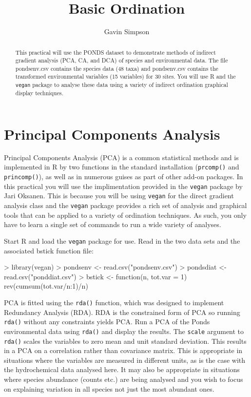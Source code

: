 \documentclass[a4paper,10pt]{article}
\title{Basic Ordination }
\author{Gavin Simpson}
\newcommand{\rda}{\texttt{rda()}\xspace}
\newcommand{\R}{\textsf{R}\xspace}
\newcommand{\vegan}{\texttt{vegan}\xspace}
\begin{document}
\maketitle

\begin{abstract}
This practical will use the PONDS dataset to demonstrate methods of indirect gradient analysis (PCA, CA, and DCA) of species and environmental data. The file pondsenv.csv contains the species data (48 taxa) and pondsenv.csv contains the transformed environmental variables (15 variables) for 30 sites. You will use \R and the \vegan package to analyse these data using a variety of indirect ordination graphical display techniques.
\end{abstract}


\section{Principal Components Analysis}
Principal Components Analysis (PCA) is a common statistical methods and is implemented in \R by two functions in the standard installation (\texttt{prcomp()} and \texttt{princomp()}), as well as in numerous guises as part of other add-on packages. In this practical you will use the implimentation provided in the \vegan package by Jari Oksanen. This is because you will be using \vegan for the direct gradient analysis class and the \vegan package provides a rich set of analysis and graphical tools that can be applied to a variety of ordination techniques. As such, you only have to learn a single set of commands to run a wide variety of analyses.

Start \R and load the \vegan package for use. Read in the two data sets and the associated bstick function file:

\begin{Schunk}
\begin{Sinput}
> library(vegan)
> pondsenv <- read.csv("pondsenv.csv")
> pondsdiat <- read.csv("ponddiat.csv")
> bstick <- function(n, tot.var = 1) rev(cumsum(tot.var/n:1)/n)
\end{Sinput}
\end{Schunk}

PCA is fitted using the \rda function, which was designed to implement Redundancy Analysis (RDA). RDA is the constrained form of PCA so running \rda without any constraints yields PCA. Run a PCA of the Ponds environmental data using \rda and display the results. The \texttt{scale} argument to \rda scales the variables to zero mean and unit standard deviation. This results in a PCA on a correlation rather than covariance matrix. This is appropriate in situations where the variables are measured in different units, as is the case with the hydrochemical data analysed here. It may also be appropriate in situations where species abundance (counts etc.) are being analysed and you wish to focus on explaining variation in all species not just the most abundant ones.
\end{document}
